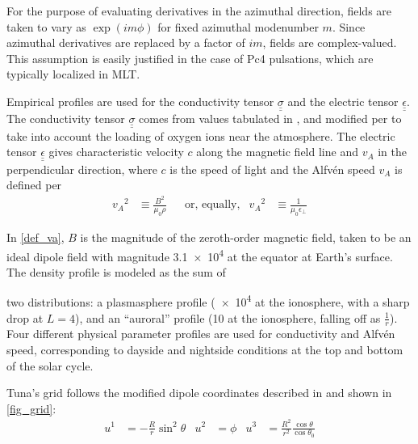 \documentclass{article}
\newcommand{\Alfven}{Alfv\'en\xspace}
\newcommand{\lysakx}{\ensuremath{u^1}\xspace}
\newcommand{\lysaky}{\ensuremath{u^2}\xspace}
\newcommand{\lysakz}{\ensuremath{u^3}\xspace}
\newcommand{\tensor}[1]{\ensuremath{\underline{\underline{#1}}}}
\newcommand{\lr}[1]{ \left( #1 \right) }
\renewcommand{\arg}[1]{\!\lr{#1}}
\newcommand{\azm}{\ensuremath{m}\xspace}
\newcommand{\va}{\ensuremath{v_A}\xspace}
\newcommand{\ep}{\ensuremath{\epsilon_\bot}\xspace}
\newcommand{\mz}{\ensuremath{\mu_0}\xspace}
\begin{document}
For the purpose of evaluating derivatives in the azimuthal direction, fields are taken to vary as $\exp \arg{i \azm \phi}$ for fixed azimuthal modenumber \azm. Since azimuthal derivatives are replaced by a factor of $i \azm$, fields are complex-valued. This assumption is easily justified in the case of Pc4 pulsations, which are typically localized in MLT\cite{anderson_1990,dai_2015,engebretson_1992,liu_2009}.


Empirical profiles are used for the conductivity tensor $\tensor{\sigma}$ and the electric tensor $\tensor{\epsilon}$. The conductivity tensor $\tensor{\sigma}$ comes from values tabulated in \cite{kelley_1989}, and modified per \cite{lysak_2013} to take into account the loading of oxygen ions near the atmosphere. The electric tensor $\tensor{\epsilon}$ gives characteristic velocity $c$ along the magnetic field line and $\va$ in the perpendicular direction, where $c$ is the speed of light and the \Alfven speed $\va$ is defined per
\begin{align}
    \label{def_va}
    \va^2 &\equiv \frac{B^2}{\mz\rho} &
    & \text{or, equally,} &
    \va^2 &\equiv \frac{1}{\mz\ep}
\end{align}

In \cref{def_va}, $B$ is the magnitude of the zeroth-order magnetic field, taken to be an ideal dipole field with magnitude \SI{3.1e4}{\nT} at the equator at Earth's surface. The density profile is modeled as the sum of

two distributions: a plasmasphere profile (\SI{e4}{\percc} at the ionosphere, with a sharp drop at $L = 4$), and an ``auroral'' profile (\SI{10}{\percc} at the ionosphere, falling off as $\frac{1}{r}$). Four different physical parameter profiles are used for conductivity and \Alfven speed, corresponding to dayside and nightside conditions at the top and bottom of the solar cycle.


Tuna's grid follows the modified dipole coordinates described in \cite{lysak_2004} and shown in \cref{fig_grid}:
\begin{align}
  \label{def_coords}
  \lysakx & = - \frac{R}{r} \sin^2 \theta &
  \lysaky & = \phi &
  \lysakz & = \frac{R^2}{r^2} \frac{\cos \theta}{\cos \theta_0}
\end{align}
\end{document}
